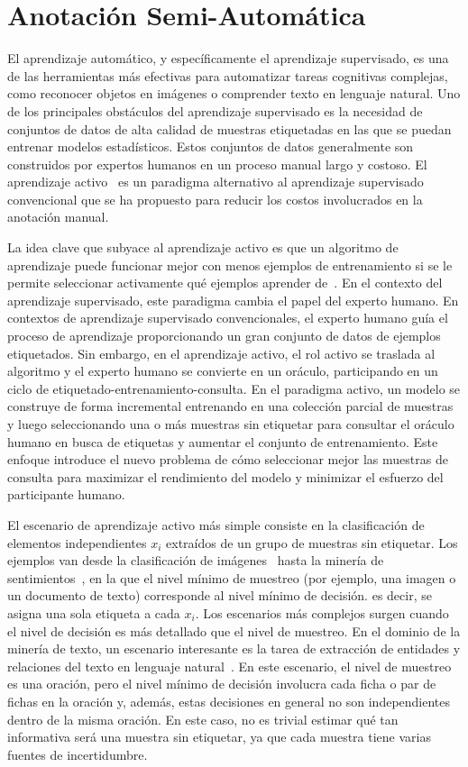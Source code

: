 \section{Anotación Semi-Automática}

El aprendizaje automático, y específicamente el aprendizaje supervisado, es una de las herramientas más efectivas para automatizar tareas cognitivas complejas, como reconocer objetos en imágenes o comprender texto en lenguaje natural. Uno de los principales obstáculos del aprendizaje supervisado es la necesidad de conjuntos de datos de alta calidad de muestras etiquetadas en las que se puedan entrenar modelos estadísticos. Estos conjuntos de datos generalmente son construidos por expertos humanos en un proceso manual largo y costoso. El aprendizaje activo~\cite{Cohn2010ActiveL} es un paradigma alternativo al aprendizaje supervisado convencional que se ha propuesto para reducir los costos involucrados en la anotación manual.

La idea clave que subyace al aprendizaje activo es que un algoritmo de aprendizaje puede funcionar mejor con menos ejemplos de entrenamiento si se le permite seleccionar activamente qué ejemplos aprender de~\cite{seungquery}.
En el contexto del aprendizaje supervisado, este paradigma cambia el papel del experto humano.
En contextos de aprendizaje supervisado convencionales, el experto humano guía el proceso de aprendizaje proporcionando un gran conjunto de datos de ejemplos etiquetados. Sin embargo, en el aprendizaje activo, el rol activo se traslada al algoritmo y el experto humano se convierte en un oráculo, participando en un ciclo de etiquetado-entrenamiento-consulta.
En el paradigma activo, un modelo se construye de forma incremental entrenando en una colección parcial de muestras y luego seleccionando una o más muestras sin etiquetar para consultar el oráculo humano en busca de etiquetas y aumentar el conjunto de entrenamiento.
Este enfoque introduce el nuevo problema de cómo seleccionar mejor las muestras de consulta para maximizar el rendimiento del modelo y minimizar el esfuerzo del participante humano.

El escenario de aprendizaje activo más simple consiste en la clasificación de elementos independientes $ x_i $ extraídos de un grupo de muestras sin etiquetar.
Los ejemplos van desde la clasificación de imágenes~\cite{Gal2017DeepBA} hasta la minería de sentimientos~\cite{Kranjc2015ActiveLF}, en la que el nivel mínimo de muestreo (por ejemplo, una imagen o un documento de texto) corresponde al nivel mínimo de decisión. es decir, se asigna una sola etiqueta a cada $ x_i $. Los escenarios más complejos surgen cuando el nivel de decisión es más detallado que el nivel de muestreo. En el dominio de la minería de texto, un escenario interesante es la tarea de extracción de entidades y relaciones del texto en lenguaje natural~\cite{zhang2012unified}.
En este escenario, el nivel de muestreo es una oración, pero el nivel mínimo de decisión involucra cada ficha o par de fichas en la oración y, además, estas decisiones en general no son independientes dentro de la misma oración.
En este caso, no es trivial estimar qué tan informativa será una muestra sin etiquetar, ya que cada muestra tiene varias fuentes de incertidumbre.

